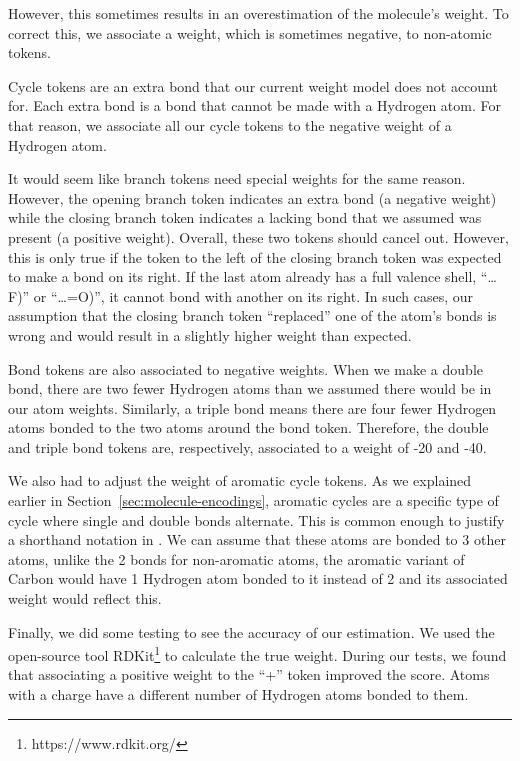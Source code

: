 \documentclass[../Document.tex]{subfiles}
\begin{document}
However, this sometimes results in an overestimation of the molecule's weight.
To correct this, we associate a weight, which is sometimes negative, to non-atomic tokens.

Cycle tokens are an extra bond that our current weight model does not account for.
Each extra bond is a bond that cannot be made with a Hydrogen atom.
For that reason, we associate all our cycle tokens to the negative weight of a Hydrogen atom.

It would seem like branch tokens need special weights for the same reason.
However, the opening branch token indicates an extra bond (\ie a negative weight) while the closing branch token indicates a lacking bond that we assumed was present (\ie a positive weight).
Overall, these two tokens should cancel out. However, this is only true if the token to the left of the closing branch token was expected to make a bond on its right. If the last atom already has a full valence shell, \eg ``\ldots F)'' or ``\ldots =O)'', it cannot bond with another on its right. In such cases, our assumption that the closing branch token ``replaced'' one of the atom's bonds is wrong and would result in a slightly higher weight than expected.

Bond tokens are also associated to negative weights.
When we make a double bond, there are two fewer Hydrogen atoms than we assumed there would be in our atom weights.
Similarly, a triple bond means there are four fewer Hydrogen atoms bonded to the two atoms around the bond token.
Therefore, the double and triple bond tokens are, respectively, associated to a weight of -20 and -40.

We also had to adjust the weight of aromatic cycle tokens.
As we explained earlier in Section~\ref{sec:molecule-encodings}, aromatic cycles are a specific type of cycle where single and double bonds alternate.
This is common enough to justify a shorthand notation in \smiles.
We can assume that these atoms are bonded to 3 other atoms, unlike the 2 bonds for non-aromatic atoms, \eg the aromatic variant of Carbon would have 1 Hydrogen atom bonded to it instead of 2 and its associated weight would reflect this.

Finally, we did some testing to see the accuracy of our estimation.
We used the open-source tool RDKit\footnote{https://www.rdkit.org/} to calculate the true weight.
During our tests, we found that associating a positive weight to the ``+'' token improved the score.
Atoms with a charge have a different number of Hydrogen atoms bonded to them.
\end{document}
